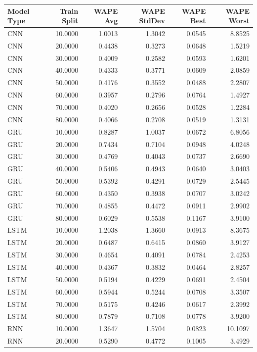 \begin{tabular}{lrrrrr}
\toprule
Model Type & Train Split & WAPE Avg & WAPE StdDev & WAPE Best & WAPE Worst \\
\midrule
CNN & 10.0000 & 1.0013 & 1.3042 & 0.0545 & 8.8525 \\
CNN & 20.0000 & 0.4438 & 0.3273 & 0.0648 & 1.5219 \\
CNN & 30.0000 & 0.4009 & 0.2582 & 0.0593 & 1.6201 \\
CNN & 40.0000 & 0.4333 & 0.3771 & 0.0609 & 2.0859 \\
CNN & 50.0000 & 0.4176 & 0.3552 & 0.0488 & 2.2807 \\
CNN & 60.0000 & 0.3957 & 0.2796 & 0.0764 & 1.4927 \\
CNN & 70.0000 & 0.4020 & 0.2656 & 0.0528 & 1.2284 \\
CNN & 80.0000 & 0.4066 & 0.2708 & 0.0519 & 1.3131 \\
GRU & 10.0000 & 0.8287 & 1.0037 & 0.0672 & 6.8056 \\
GRU & 20.0000 & 0.7434 & 0.7104 & 0.0948 & 4.0248 \\
GRU & 30.0000 & 0.4769 & 0.4043 & 0.0737 & 2.6690 \\
GRU & 40.0000 & 0.5406 & 0.4943 & 0.0640 & 3.0403 \\
GRU & 50.0000 & 0.5392 & 0.4291 & 0.0729 & 2.5445 \\
GRU & 60.0000 & 0.4350 & 0.3938 & 0.0707 & 3.0242 \\
GRU & 70.0000 & 0.4855 & 0.4472 & 0.0911 & 2.9902 \\
GRU & 80.0000 & 0.6029 & 0.5538 & 0.1167 & 3.9100 \\
LSTM & 10.0000 & 1.2038 & 1.3660 & 0.0913 & 8.3675 \\
LSTM & 20.0000 & 0.6487 & 0.6415 & 0.0860 & 3.9127 \\
LSTM & 30.0000 & 0.4654 & 0.4091 & 0.0784 & 2.4253 \\
LSTM & 40.0000 & 0.4367 & 0.3832 & 0.0464 & 2.8257 \\
LSTM & 50.0000 & 0.5194 & 0.4229 & 0.0691 & 2.4504 \\
LSTM & 60.0000 & 0.5944 & 0.5244 & 0.0708 & 3.3507 \\
LSTM & 70.0000 & 0.5175 & 0.4246 & 0.0617 & 2.3992 \\
LSTM & 80.0000 & 0.7879 & 0.7108 & 0.0778 & 3.9200 \\
RNN & 10.0000 & 1.3647 & 1.5704 & 0.0823 & 10.1097 \\
RNN & 20.0000 & 0.5290 & 0.4772 & 0.1005 & 3.4929 \\

\end{tabular}
